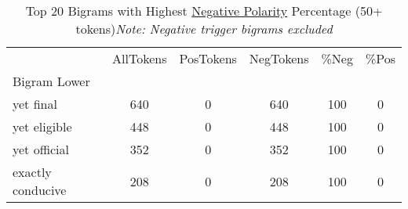 

\singlespacing
\scriptsize\noindent
\begin{table}
\centering
\caption{Top 20 Bigrams with Highest \underline{Negative Polarity} Percentage (50+ tokens)\textit{Note: Negative trigger bigrams excluded}}
\label{tab:top10NegPercent50+}
\begin{tabular}{*{1}{l}S[table-auto-round, table-format=7.2, drop-zero-decimal]
    S[table-auto-round, table-format=7.2, drop-zero-decimal]
    S[table-auto-round, table-format=7.2, drop-zero-decimal]
    S[table-auto-round, table-format=7.2, drop-zero-decimal]
    S[table-auto-round, table-format=7.2, drop-zero-decimal]}
\toprule
{} & {AllTokens} & {PosTokens} & {NegTokens} & {\%Neg} & {\%Pos} \\
{Bigram Lower} & {} & {} & {} & {} & {} \\
\midrule
yet final & {} \color[HTML]{F1F1F1} 640 & {} \color[HTML]{000000} 0 & {} \color[HTML]{F1F1F1} 640 & {} \color[HTML]{000000} 100 & {} \color[HTML]{000000} 0 \\
yet eligible & {} \color[HTML]{F1F1F1} 448 & {} \color[HTML]{000000} 0 & {} \color[HTML]{F1F1F1} 448 & {} \color[HTML]{000000} 100 & {} \color[HTML]{000000} 0 \\
yet official & {} \color[HTML]{F1F1F1} 352 & {} \color[HTML]{000000} 0 & {} \color[HTML]{F1F1F1} 352 & {} \color[HTML]{000000} 100 & {} \color[HTML]{000000} 0 \\
exactly conducive & {} \color[HTML]{000000} 208 & {} \color[HTML]{000000} 0 & {} \color[HTML]{000000} 208 & {} \color[HTML]{000000} 100 & {} \color[HTML]{000000} 0 \\

\end{tabular}
\end{table}
